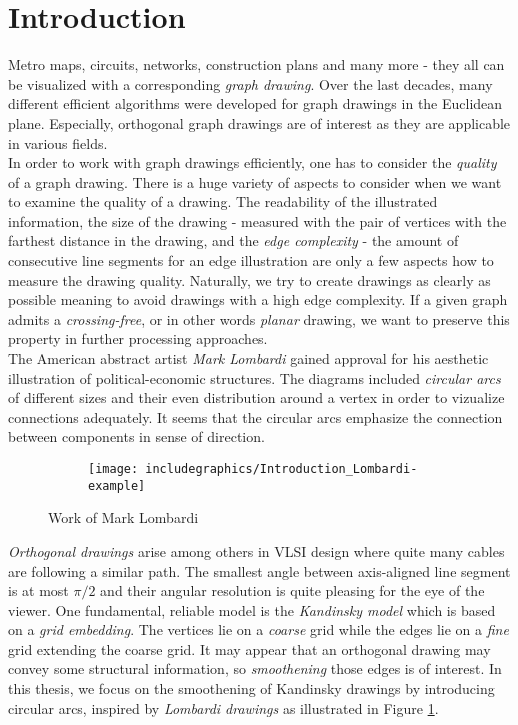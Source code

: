 \section{Introduction}
Metro maps, circuits, networks, construction plans and many more - they all can be visualized with a corresponding \textit{graph drawing}. Over the last decades, many different efficient algorithms were developed for graph drawings in the Euclidean plane. Especially, orthogonal graph drawings are of interest as they are applicable in various fields.
\\In order to work with graph drawings efficiently, one has to consider the \textit{quality} of a graph drawing. There is a huge variety of aspects to consider when we want to examine the quality of a drawing. The readability of the illustrated information, the size of the drawing - measured with the pair of vertices with the farthest distance in the drawing, and the \textit{edge complexity} - the amount of consecutive line segments for an edge illustration are only a few aspects how to measure the drawing quality. Naturally, we try to create drawings as clearly as possible meaning to avoid drawings with a high edge complexity. If a given graph admits a \textit{crossing-free}, or in other words \textit{planar} drawing, we want to preserve this property in further processing approaches.
\\The American abstract artist \textit{Mark Lombardi} gained approval for his aesthetic illustration of political-economic structures. The diagrams included \textit{circular arcs} of different sizes and their even distribution around a vertex in order to vizualize connections adequately. It seems that the circular arcs emphasize the connection between components in sense of direction.
\begin{figure}[H]
	\centering
	\begin{subfigure}{\textwidth}
		\centering
		\texttt{[image: includegraphics/Introduction\_Lombardi-example]}
	\end{subfigure}
\caption{Work of Mark Lombardi \cite{lombardi_ex}}\label{im:lombardi_ex}
\end{figure}
\textit{Orthogonal drawings} arise among others in VLSI design where quite many cables are following a similar path. The smallest angle between axis-aligned line segment is at most $\pi/2$ and their angular resolution is quite pleasing for the eye of the viewer. One fundamental, reliable model is the \textit{Kandinsky model} which is based on a \textit{grid embedding}. The vertices lie on a \textit{coarse} grid while the edges lie on a \textit{fine} grid extending the coarse grid. It may appear that an orthogonal drawing may convey some structural information, so \textit{smoothening} those edges is of interest. In this thesis, we focus on the smoothening of Kandinsky drawings by introducing circular arcs, inspired by \textit{Lombardi drawings} as illustrated in Figure \ref{im:lombardi_ex}\cite{lombardi_src1}\cite{lombardi_src2}. 
